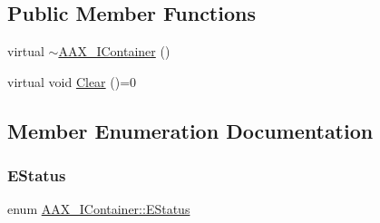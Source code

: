 \subsection*{Public Member Functions}
\begin{DoxyCompactItemize}
\item 
virtual \mbox{\hyperlink{a01785_ac8974c4fdc9352dc662bf7242b83c7c9}{$\sim$\+A\+A\+X\+\_\+\+I\+Container}} ()
\item 
virtual void \mbox{\hyperlink{a01785_a35280907fac53883d3501beef8c30596}{Clear}} ()=0
\end{DoxyCompactItemize}


\subsection{Member Enumeration Documentation}
\mbox{\label{a01785_aea020100f0b06636ce7cb25c2fdb0af7}} 
\subsubsection{\texorpdfstring{EStatus}{EStatus}}
{\footnotesize\ttfamily enum \mbox{\hyperlink{a01785_aea020100f0b06636ce7cb25c2fdb0af7}{A\+A\+X\+\_\+\+I\+Container\+::\+E\+Status}}}

